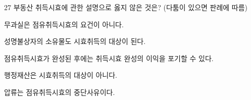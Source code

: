 \begin{question}{27}
부동산 취득시효에 관한 설명으로 옳지 않은 것은? (다툼이 있으면 판례에 따름)
\begin{choices}
  \item 무과실은 점유취득시효의 요건이 아니다.
  \item 성명불상자의 소유물도 시효취득의 대상이 된다.
  \item 점유취득시효가 완성된 후에는 취득시효 완성의 이익을 포기할 수 있다.
  \item 행정재산은 시효취득의 대상이 아니다.
  \item 압류는 점유취득시효의 중단사유이다.
\end{choices}
\end{question}
